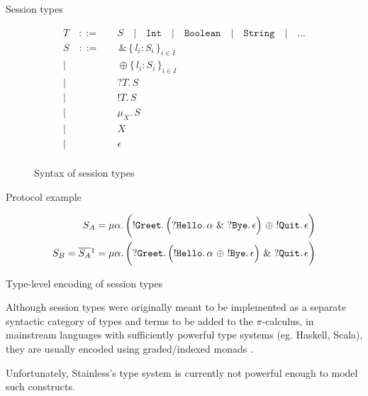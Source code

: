 \documentclass[ignorenonframetext,]{beamer}
\begin{document}
\begin{frame}{%
\protect\hypertarget{session-types-1}{%
Session types}}

\begin{figure}
\begin{align*}
T\quad::=&\quad     S
   \quad|\quad \texttt{Int}
   \quad|\quad \texttt{Boolean}
   \quad|\quad \texttt{String}
   \quad|\quad \ldots \tag*{payload}
\\
S\quad::=&\quad     \,\&\,\{\,l_i: S_i\,\}_{i\in I}         \tag*{branching}\\
        |&\quad     \oplus\{\,l_i: S_i\,\}_{i\in I}         \tag*{selection}\\
        |&\quad     ?T.\, S                                 \tag*{receive}\\
        |&\quad     !T.\, S                                 \tag*{send}\\
        |&\quad     \mu_X.\, S                              \tag*{recursion}\\
        |&\quad     X                                       \tag*{variable}\\
        |&\quad     \epsilon                                \tag*{termination}\\
\end{align*}
\vspace{-20pt}
\caption{Syntax of session types \label{fig:sess-syntax}}
\end{figure}

\end{frame}

\begin{frame}{%
\protect\hypertarget{protocol-example}{%
Protocol example}}

\begin{align*}
S_A &= \mu\alpha.\,\bigg(!\texttt{Greet}.\,\Big(?\texttt{Hello}.\,\alpha\ \&\ ?\texttt{Bye}.\, \epsilon \Big)\ \oplus\ !\texttt{Quit}.\,\epsilon \bigg)\\
S_B = \overline{S_A}\footnotemark[1] &= \mu\alpha.\,\bigg(?\texttt{Greet}.\,\Big(!\texttt{Hello}.\,\alpha\ \oplus\ !\texttt{Bye}.\, \epsilon \Big)\ \&\ ?\texttt{Quit}.\,\epsilon \bigg)\\
\end{align*}


\end{frame}

\begin{frame}{%
\protect\hypertarget{type-level-encoding-of-session-types}{%
Type-level encoding of session types}}

Although session types were originally meant to be implemented as a
separate syntactic category of types and terms to be added to the
\(\pi\)-calculus, in mainstream languages with sufficiently powerful
type systems (eg. Haskell, Scala), they are usually encoded using
graded/indexed monads \cite{st_lin_haskell}.

Unfortunately, Stainless’s type system is currently not powerful enough
to model such constructs.

\end{frame}
\end{document}
